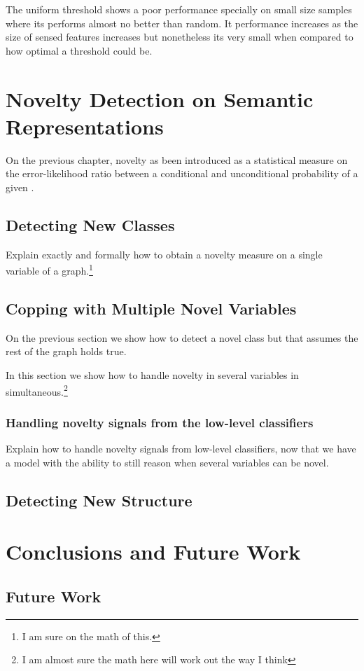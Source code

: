 The uniform threshold shows a poor performance specially on small size samples
where its performs almost no better than random.
It performance increases as the size of sensed features increases but nonetheless
its very small when compared to how optimal a threshold could be.




\chapter{Novelty Detection on Semantic Representations}\label{chap:novelty}
On the previous chapter, novelty as been introduced as a statistical
measure on the error-likelihood ratio between a conditional and unconditional
probability of a given .


\section{Detecting New Classes}
Explain exactly and formally how to obtain a novelty measure on a single
variable of a graph.\footnote{I am sure on the math of this.}

\section{Copping with Multiple Novel Variables}
On the previous section we show how to detect a novel class but that assumes
the rest of the graph holds true.

In this section we show how to handle novelty in several variables
in simultaneous.\footnote{I am almost sure the math here will work out the
way I think}

\subsection{Handling novelty signals from the low-level classifiers}
Explain how to handle novelty signals from low-level classifiers, now that we
have a model with the ability to still reason when several variables can be
novel.

\section{Detecting New Structure}

\chapter{Conclusions and Future Work}\label{chap:conclusions}
\section{Future Work}

